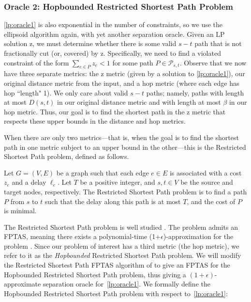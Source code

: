 \subsubsection{Oracle 2: Hopbounded Restricted Shortest Path Problem}
\ref{lp:oracle1} is also exponential in the number of constraints, so we use the ellipsoid algorithm again, with yet another separation oracle. Given an LP solution $\bm{\mathrm{z}}$, we must determine whether there is some valid $s-t$ path that is not fractionally cut (or, covered) by $\bm{\mathrm{z}}$. Specifically, we need to find a violated constraint of the form $\sum_{e \in P} z_e < 1$ for some path $P \in \mathcal{P}_{s,t}$. Observe that we now have three separate metrics: the $\bm{\mathrm{z}}$ metric (given by a solution to \ref{lp:oracle1}), our original distance metric from the input, and a hop metric (where each edge has hop ``length" 1). We only care about valid $s-t$ paths; namely, paths with length at most $D(s,t)$ in our original distance metric and with length at most $\beta$ in our hop metric. Thus, our goal is to find the shortest path in the $\bm{\mathrm{z}}$ metric that respects these upper bounds in the distance and hop metrics. 

When there are only two metrics---that is, when the goal is to find the shortest path in one metric subject to an upper bound in the other---this is the Restricted Shortest Path problem, defined as follows.

\begin{definition} 
    Let $G = (V,E)$ be a graph such that each edge $e \in E$ is associated with a cost $z_e$ and a delay $\ell_e$. Let $T$ be a positive integer, and $s,t \in V$ be the source and target nodes, respectively. The Restricted Shortest Path problem is to find a path $P$ from $s$ to $t$ such that the delay along this path is at most $T$, and the cost of $P$ is minimal.
\end{definition}

The Restricted Shortest Path problem is well studied \cite{Has92, War87, Phi93, XZTT08}. The problem admits an FPTAS, meaning there exists a polynomial-time (1+$\epsilon$)-approximation for the problem \cite{LR01}. Since our problem of interest has a third metric (the hop metric), we refer to it as the \textit{Hopbounded} Restricted Shortest Path problem. We \iflong will \else \fi modify the Restricted Shortest Path FPTAS algorithm of \cite{LR01} to give an FPTAS for the Hopbounded Restricted Shortest Path problem, thus giving a $(1+\epsilon)$-approximate separation oracle for~\ref{lp:oracle1}. We formally define the Hopbounded Restricted Shortest Path problem with respect to~\ref{lp:oracle1}:

